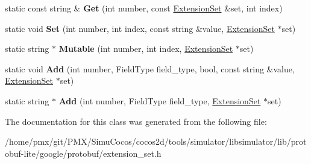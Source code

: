 \begin{DoxyCompactItemize}
static const string \& {\bfseries Get} (int number, const \hyperlink{classgoogle_1_1protobuf_1_1internal_1_1ExtensionSet}{Extension\+Set} \&set, int index)
\item 
\mbox{\label{classgoogle_1_1protobuf_1_1internal_1_1RepeatedStringTypeTraits_adb50ff9a02e230bacfe4e9e9dcfc1933}} 
static void {\bfseries Set} (int number, int index, const string \&value, \hyperlink{classgoogle_1_1protobuf_1_1internal_1_1ExtensionSet}{Extension\+Set} $\ast$set)
\item 
\mbox{\label{classgoogle_1_1protobuf_1_1internal_1_1RepeatedStringTypeTraits_ab327262de3fe8fcc6cd15f1f39251119}} 
static string $\ast$ {\bfseries Mutable} (int number, int index, \hyperlink{classgoogle_1_1protobuf_1_1internal_1_1ExtensionSet}{Extension\+Set} $\ast$set)
\item 
\mbox{\label{classgoogle_1_1protobuf_1_1internal_1_1RepeatedStringTypeTraits_a72b3d8e2594bb89c892158227f1bac1b}} 
static void {\bfseries Add} (int number, Field\+Type field\+\_\+type, bool, const string \&value, \hyperlink{classgoogle_1_1protobuf_1_1internal_1_1ExtensionSet}{Extension\+Set} $\ast$set)
\item 
\mbox{\label{classgoogle_1_1protobuf_1_1internal_1_1RepeatedStringTypeTraits_a88211fc41b11729a309e7aece5869d86}} 
static string $\ast$ {\bfseries Add} (int number, Field\+Type field\+\_\+type, \hyperlink{classgoogle_1_1protobuf_1_1internal_1_1ExtensionSet}{Extension\+Set} $\ast$set)
\end{DoxyCompactItemize}


The documentation for this class was generated from the following file\+:\begin{DoxyCompactItemize}
\item 
/home/pmx/git/\+P\+M\+X/\+Simu\+Cocos/cocos2d/tools/simulator/libsimulator/lib/protobuf-\/lite/google/protobuf/extension\+\_\+set.\+h\end{DoxyCompactItemize}
